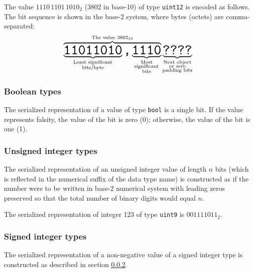 \begin{remark}
    The value $1110\,1101\,1010_2$ (3802 in base-10) of type \verb|uint12| is encoded as follows.
    The bit sequence is shown in the base-2 system, where bytes (octets) are comma-separated:
    $$
        \overbrace{%
            \underbrace{\hugett{11011010}}_{\substack{\text{Least significant} \\ \text{bits/byte}}}%
            \hugett{,}%
            \underbrace{\hugett{1110}}_{\substack{\text{Most} \\ \text{significant} \\ \text{bits}}}%
        }^{\text{The value }3802_{10}}%
        \underbrace{\hugett{????}}_{\substack{\text{Next object} \\ \text{or zero} \\ \text{padding bits}}}
    $$
\end{remark}

\subsubsection{Boolean types}\label{sec:dsdl_serialized_bool}

The serialized representation of a value of type \verb|bool| is a single bit.
If the value represents falsity, the value of the bit is zero (0); otherwise, the value of the bit is one (1).

\subsubsection{Unsigned integer types}\label{sec:dsdl_serialized_unsigned_integer}

The serialized representation of an unsigned integer value of length $n$ bits
(which is reflected in the numerical suffix of the data type name)
is constructed as if the number were to be written in base-2 numerical system
with leading zeros preserved so that the total number of binary digits would equal $n$.

\begin{remark}
    The serialized representation of integer 123 of type \verb|uint9| is $001111011_2$.
\end{remark}

\subsubsection{Signed integer types}

The serialized representation of a non-negative value of a signed integer type is constructed as described
in section \ref{sec:dsdl_serialized_unsigned_integer}.

